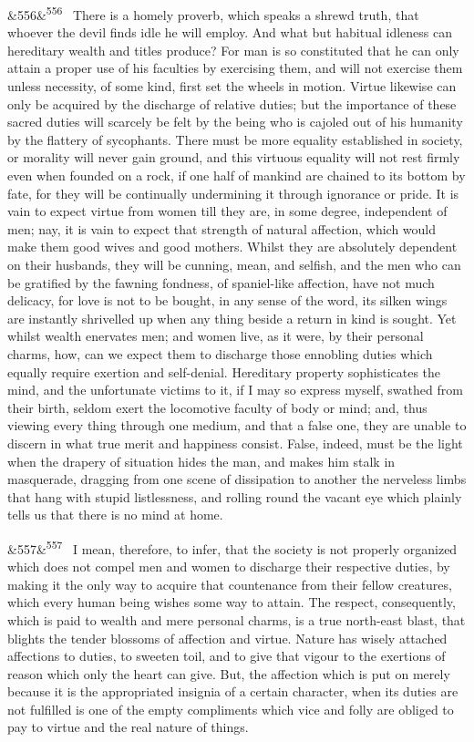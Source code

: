 \documentclass[12pt]{article}
\newcommand{\para}[1][]{\par\noindent\ifx&#1&\else\textsuperscript{\footnotesize #1}~\fi}
\begin{document}
\para[556] There is a homely proverb, which speaks a shrewd truth, that whoever the devil finds idle he will employ. And what but habitual idleness can hereditary wealth and titles produce? For man is so constituted that he can only attain a proper use of his faculties by exercising them, and will not exercise them unless necessity, of some kind, first set the wheels in motion. Virtue likewise can only be acquired by the discharge of relative duties; but the importance of these sacred duties will scarcely be felt by the being who is cajoled out of his humanity by the flattery of sycophants. There must be more equality established in society, or morality will never gain ground, and this virtuous equality will not rest firmly even when founded on a rock, if one half of mankind are chained to its bottom by fate, for they will be continually undermining it through ignorance or pride. It is vain to expect virtue from women till they are, in some degree, independent of men; nay, it is vain to expect that strength of natural affection, which would make them good wives and good mothers. Whilst they are absolutely dependent on their husbands, they will be cunning, mean, and selfish, and the men who can be gratified by the fawning fondness, of spaniel-like affection, have not much delicacy, for love is not to be bought, in any sense of the word, its silken wings are instantly shrivelled up when any thing beside a return in kind is sought. Yet whilst wealth enervates men; and women live, as it were, by their personal charms, how, can we expect them to discharge those ennobling duties which equally require exertion and self-denial. Hereditary property sophisticates the mind, and the unfortunate victims to it, if I may so express myself, swathed from their birth, seldom exert the locomotive faculty of body or mind; and, thus viewing every thing through one medium, and that a false one, they are unable to discern in what true merit and happiness consist. False, indeed, must be the light when the drapery of situation hides the man, and makes him stalk in masquerade, dragging from one scene of dissipation to another the nerveless limbs that hang with stupid listlessness, and rolling round the vacant eye which plainly tells us that there is no mind at home.

\para[557] I mean, therefore, to infer, that the society is not properly organized which does not compel men and women to discharge their respective duties, by making it the only way to acquire that countenance from their fellow creatures, which every human being wishes some way to attain. The respect, consequently, which is paid to wealth and mere personal charms, is a true north-east blast, that blights the tender blossoms of affection and virtue. Nature has wisely attached affections to duties, to sweeten toil, and to give that vigour to the exertions of reason which only the heart can give. But, the affection which is put on merely because it is the appropriated insignia of a certain character, when its duties are not fulfilled is one of the empty compliments which vice and folly are obliged to pay to virtue and the real nature of things.
\end{document}
